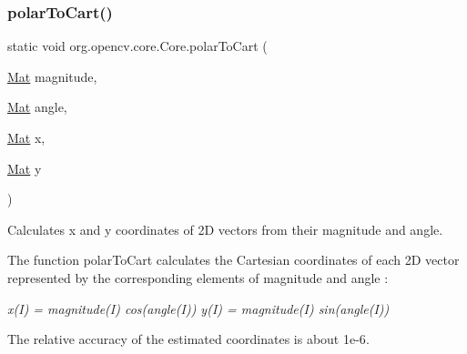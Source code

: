 \mbox{\label{classorg_1_1opencv_1_1core_1_1_core_aa5d94ecf80128fd344c06cd4d286cfd6}} 
\subsubsection{\texorpdfstring{polar\+To\+Cart()}{polarToCart()}\hspace{0.1cm}{\footnotesize\ttfamily [2/2]}}
{\footnotesize\ttfamily static void org.\+opencv.\+core.\+Core.\+polar\+To\+Cart (\begin{DoxyParamCaption}\item[{\mbox{\hyperlink{classorg_1_1opencv_1_1core_1_1_mat}{Mat}}}]{magnitude,  }\item[{\mbox{\hyperlink{classorg_1_1opencv_1_1core_1_1_mat}{Mat}}}]{angle,  }\item[{\mbox{\hyperlink{classorg_1_1opencv_1_1core_1_1_mat}{Mat}}}]{x,  }\item[{\mbox{\hyperlink{classorg_1_1opencv_1_1core_1_1_mat}{Mat}}}]{y }\end{DoxyParamCaption})\hspace{0.3cm}{\ttfamily [static]}}

Calculates x and y coordinates of 2D vectors from their magnitude and angle.

The function {\ttfamily polar\+To\+Cart} calculates the Cartesian coordinates of each 2D vector represented by the corresponding elements of {\ttfamily magnitude} and {\ttfamily angle} \+:

{\itshape x(\+I) = magnitude(\+I) cos(angle(\+I)) y(\+I) = magnitude(\+I) sin(angle(\+I)) }

The relative accuracy of the estimated coordinates is about {\ttfamily 1e-\/6}.


